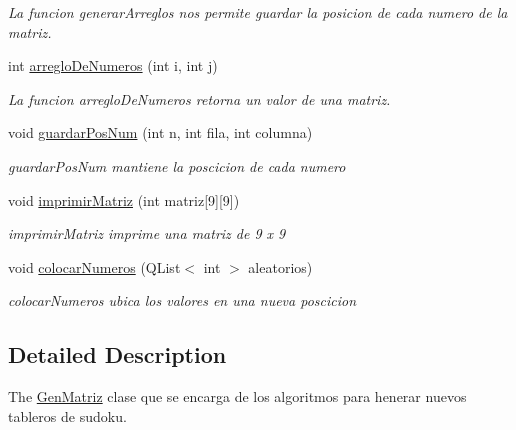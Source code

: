 \begin{DoxyCompactItemize}
\begin{DoxyCompactList}\small\item\em La funcion generar\-Arreglos nos permite guardar la posicion de cada numero de la matriz. \end{DoxyCompactList}\item 
int \hyperlink{class_gen_matriz_af86ecf150e71673b7ed1e488f5f61efb}{arreglo\-De\-Numeros} (int i, int j)
\begin{DoxyCompactList}\small\item\em La funcion arreglo\-De\-Numeros retorna un valor de una matriz. \end{DoxyCompactList}\item 
void \hyperlink{class_gen_matriz_af5686320072f21d88b5fbc85963bc280}{guardar\-Pos\-Num} (int n, int fila, int columna)
\begin{DoxyCompactList}\small\item\em guardar\-Pos\-Num mantiene la poscicion de cada numero \end{DoxyCompactList}\item 
void \hyperlink{class_gen_matriz_ae58e92d9d0efc983f96b53a02f9cd8a5}{imprimir\-Matriz} (int matriz\mbox{[}9\mbox{]}\mbox{[}9\mbox{]})
\begin{DoxyCompactList}\small\item\em imprimir\-Matriz imprime una matriz de 9 x 9 \end{DoxyCompactList}\item 
void \hyperlink{class_gen_matriz_aa67088279c4f7a0877c6b128db8d0ff5}{colocar\-Numeros} (Q\-List$<$ int $>$ aleatorios)
\begin{DoxyCompactList}\small\item\em colocar\-Numeros ubica los valores en una nueva poscicion \end{DoxyCompactList}\end{DoxyCompactItemize}


\subsection{Detailed Description}
The \hyperlink{class_gen_matriz}{Gen\-Matriz} clase que se encarga de los algoritmos para henerar nuevos tableros de sudoku. 

